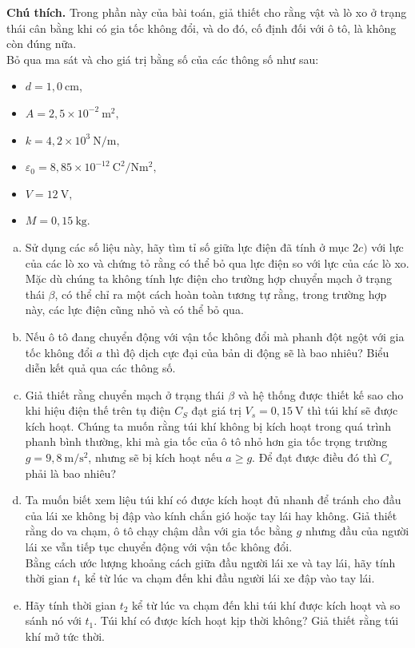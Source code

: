 \begin{vd}
\begin{enumerate}[1)]
    \textbf{Chú thích.} Trong phần này của bài toán, giả thiết cho rằng vật và lò xo ở trạng thái cân bằng khi có gia tốc không đổi, và do đó, cố định đối với ô tô, là không còn đúng nữa.\\
    Bỏ qua ma sát và cho giá trị bằng số của các thông số như sau:
    \begin{itemize}
        \item $d = 1,0 \mathrm{~cm}$,
        \item $A = 2,5 \times 10^{-2} \mathrm{~m}^{2},$
        \item $k = 4,2 \times 10^{3} \mathrm{~N} / \mathrm{m},$
        \item $\varepsilon_{0} = 8,85 \times 10^{-12} ~\mathrm{C}^{2} / \mathrm{N}\mathrm{m}^{2},$
        \item $V = 12 \mathrm{~V},$
        \item  $ M = 0,15 \mathrm{~kg}$.
    \end{itemize}
    \begin{enumerate}[a)]
        \item Sử dụng các số liệu này, hãy tìm tỉ số giữa lực điện đã tính ở mục $2c)$ với lực của các lò xo và chứng tỏ rằng có thể bỏ qua lực điện so với lực của các lò xo.\\
    Mặc dù chúng ta không tính lực điện cho trường hợp chuyển mạch ở trạng thái $\beta$, có thể chỉ ra một cách hoàn toàn tương tự rằng, trong trường hợp này, các lực điện cũng nhỏ và có thể bỏ qua.
        \item Nếu ô tô đang chuyển động với vận tốc không đổi mà phanh đột ngột với gia tốc không đổi $a$ thì độ dịch cực đại của bản di động sẽ là bao nhiêu? Biểu diễn kết quả qua các thông số.
        \item Giả thiết rằng chuyển mạch ở trạng thái $\beta$ và hệ thống được thiết kế sao cho khi hiệu điện thế trên tụ điện $C_{S}$ đạt giá trị $V_{s}=0,15 \mathrm{~V}$ thì túi khí sẽ được kích hoạt. Chúng ta muốn rằng túi khí không bị kích hoạt trong quá trình phanh bình thường, khi mà gia tốc của ô tô nhỏ hơn gia tốc trọng trường $g=9,8 \mathrm{~m} / \mathrm{s}^{2}$, nhưng sẽ bị kích hoạt nếu $a \geq g$. Để đạt được điều đó thì $C_{s}$ phải là bao nhiêu?
        \item Ta muốn biết xem liệu túi khí có được kích hoạt đủ nhanh để tránh cho đầu của lái xe không bị đập vào kính chắn gió hoặc tay lái hay không. Giả thiết rằng do va chạm, ô tô chạy chậm dần với gia tốc bằng $g$ nhưng đầu của người lái xe vẫn tiếp tục chuyển động với vận tốc không đổi.\\
        Bằng cách ước lượng khoảng cách giữa đầu người lái xe và tay lái, hãy tính thời gian $t_{1}$ kể từ lúc va chạm đến khi đầu người lái xe đập vào tay lái.
        \item Hãy tính thời gian $t_{2}$ kể từ lúc va chạm đến khi túi khí được kích hoạt và so sánh nó với $t_{1}$. Túi khí có được kích hoạt kịp thời không? Giả thiết rằng túi khí mở tức thời.
    \end{enumerate}
\end{enumerate}
\end{vd}
